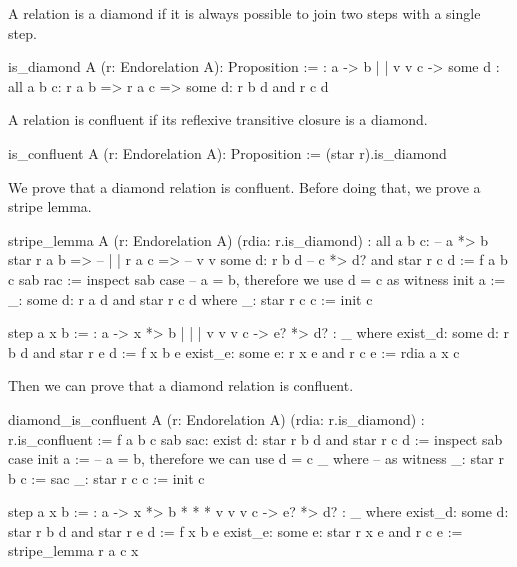 A relation is a diamond if it is always possible to join two steps with a
single step.

\begin{alba}
  is_diamond A (r: Endorelation A): Proposition :=
      {:   a  ->  b
           |      |
           v      v
           c  -> some d :}
    all a b c:
      r a b
      => r a c
      => some d: r b d and r c d
\end{alba}


A relation is confluent if its reflexive transitive closure is a diamond.

\begin{alba}
  is_confluent A (r: Endorelation A): Proposition :=
    (star r).is_diamond
\end{alba}



We prove that a diamond relation is confluent. Before doing that, we prove a
stripe lemma.

\begin{alba}
  stripe_lemma
    A
    (r: Endorelation A)
    (rdia: r.is_diamond)
    : all a b c:                       --  a *> b
        star r a b =>                  --  |    |
        r a c =>                       --  v    v
        some d: r b d                  --  c *> d?
                and
                star r c d :=
     f a b c sab rac :=
       inspect sab case   -- a = b, therefore we use d = c as witness
         init a :=
           _: some d: r a d and star r c d  where
             _: star r c c := init c

         step a x b :=
           {:  a  -> x  *> b
               |     |     |
               v     v     v
               c  -> e? *> d? :}
           _ where
             exist_d: some d: r b d and star r e d := f x b e
             exist_e: some e: r x e and r c e      := rdia a x c
\end{alba}

Then we can prove that a diamond relation is confluent.

\begin{alba}
  diamond_is_confluent
    A
    (r: Endorelation A)
    (rdia: r.is_diamond)
    : r.is_confluent
    :=
      f a b c sab sac: exist d: star r b d and star r c d :=
        inspect sab case
          init a :=            -- a = b, therefore we can use d = c
            _ where            --        as witness
              _: star r b c := sac
              _: star r c c := init c

          step a x b :=
            {:  a  ->  x  *>  b
                *      *      *
                v      v      v
                c  ->  e? *>  d? :}
            _ where
              exist_d: some d: star r b d and star r e d := f x b e
              exist_e: some e: star r x e and r c e := stripe_lemma r a c x

\end{alba}




